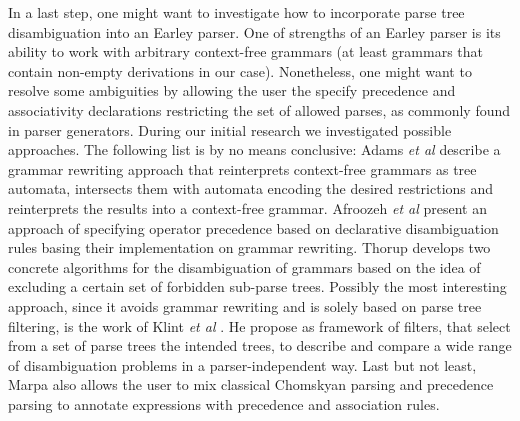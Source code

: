 \begin{isabellebody}
\begin{isamarkuptext}
In a last step, one might want to investigate how to incorporate parse tree disambiguation into an
Earley parser. One of strengths of an Earley parser is its ability to work with arbitrary context-free
grammars (at least grammars that contain non-empty derivations in our case). Nonetheless, one might
want to resolve some ambiguities by allowing the user the specify precedence and associativity declarations
restricting the set of allowed parses, as commonly found in parser generators. During our initial
research we investigated possible approaches. The following list is by no means conclusive:
Adams \textit{et al} \cite{Adams:2017} describe a grammar rewriting approach that reinterprets context-free
grammars as tree automata, intersects them with automata encoding the desired restrictions and reinterprets
the results into a context-free grammar. Afroozeh \textit{et al} \cite{Afroozeh:2013} present an approach
of specifying operator precedence based on declarative disambiguation rules basing their implementation
on grammar rewriting. Thorup \cite{Thorup:1996} develops two concrete algorithms for the disambiguation of
grammars based on the idea of excluding a certain set of forbidden sub-parse trees.
Possibly the most interesting approach, since it avoids grammar rewriting and is solely based on parse
tree filtering, is the work of Klint \textit{et al} \cite{Klint:1997}. He propose as framework of filters, that select from
a set of parse trees the intended trees, to describe and compare a wide range of disambiguation problems
in a parser-independent way. Last but not least, Marpa also allows the user to mix classical Chomskyan
parsing and precedence parsing to annotate expressions with precedence and association rules.%
\end{isamarkuptext}\isamarkuptrue%
%
\isadelimtheory
%
\endisadelimtheory
%
\isatagtheory
%
\endisatagtheory
{\isafoldtheory}%
%
\isadelimtheory
%
\endisadelimtheory
%
\end{isabellebody}%
\endinput
